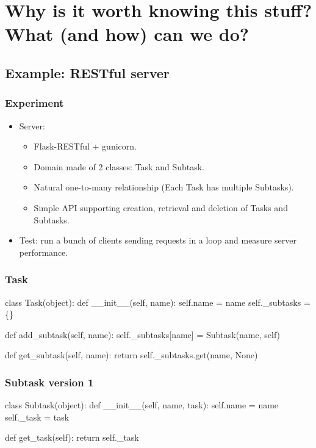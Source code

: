 \documentclass{beamer}
\begin{document}
\section{Why is it worth knowing this stuff? What (and how) can we do?}
\frame\sectionpage
\subsection{Example: RESTful server}
\frame\subsectionpage
    \begin{frame}
        \frametitle{Experiment}
        \begin{itemize}
            \item Server:
            \begin{itemize}
                \item Flask-RESTful + gunicorn.
                \item Domain made of 2 classes: Task and Subtask.
                \item Natural one-to-many relationship (Each Task has multiple Subtasks).
                \item Simple API supporting creation, retrieval and deletion of Tasks and Subtasks.
            \end{itemize}
            \item Test: run a bunch of clients sending requests in a loop and measure server performance.
        \end{itemize}
    \end{frame}

    \begin{frame}[fragile]
        \frametitle{Task}
        \begin{semiverbatim}
class Task(object):
    def __init__(self, name):
        self.name = name
        self._subtasks = \{\}

    def add_subtask(self, name):
        self._subtasks[name] = Subtask(name, self)

    def get_subtask(self, name):
        return self._subtasks.get(name, None)
        \end{semiverbatim}
\end{frame}

    \begin{frame}[fragile]
        \frametitle{Subtask version 1}
        \begin{semiverbatim}
class Subtask(object):
    def __init__(self, name, task):
        self.name = name
        self._task = task

    def get_task(self):
        return self._task
        \end{semiverbatim}
\end{frame}
\end{document}
